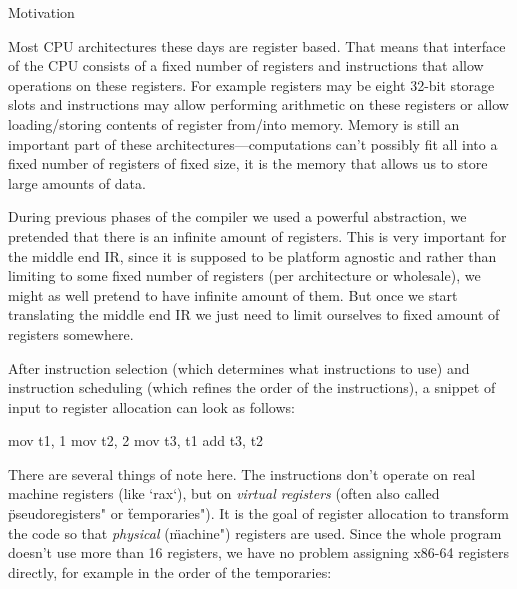 \secc Motivation

Most CPU architectures these days are register based. That means that interface
of the CPU consists of a fixed number of registers and instructions that allow
operations on these registers. For example registers may be eight 32-bit storage slots
and instructions may allow performing arithmetic on these registers or allow
loading/storing contents of register from/into memory. Memory is still an
important part of these architectures---computations can't possibly fit all into
a fixed number of registers of fixed size, it is the memory that allows us to
store large amounts of data.

During previous phases of the compiler we used a powerful abstraction, we
pretended that there is an infinite amount of registers. This is very important
for the middle end IR, since it is supposed to be platform agnostic and rather
than limiting to some fixed number of registers (per architecture or wholesale),
we might as well pretend to have infinite amount of them. But once we start
translating the middle end IR we just need to limit ourselves to fixed amount of
registers somewhere.

After instruction selection (which determines what instructions to use) and
instruction scheduling (which refines the order of the instructions), a snippet
of input to register allocation can look as follows:

\begtt
mov t1, 1
mov t2, 2
mov t3, t1
add t3, t2
\endtt

%
%


There are several things of note here. The instructions don't operate on real
machine registers (like `rax`), but on {\em virtual registers} (often also called
\"pseudoregisters" or \"temporaries"). It is the goal of register allocation to
transform the code so that {\em physical} (\"machine") registers are used.
Since the whole program doesn't use more than 16 registers, we have no problem
assigning x86-64 registers directly, for example in the order of the
temporaries:

